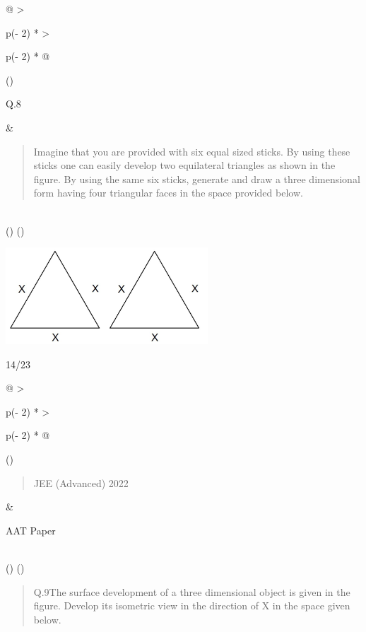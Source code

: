 \documentclass[
]{article}
\begin{document}
\begin{longtable}[]{@{}
  >{\raggedright\arraybackslash}p{(\columnwidth - 2\tabcolsep) * }
  >{\raggedright\arraybackslash}p{(\columnwidth - 2\tabcolsep) * }@{}}
\toprule()
\begin{minipage}[b]{\linewidth}\raggedright
Q.8
\end{minipage} & \begin{minipage}[b]{\linewidth}\raggedright
\begin{quote}
Imagine that you are provided with six equal sized sticks. By using
these sticks one can easily develop two equilateral triangles as shown
in the figure. By using the same six sticks, generate and draw a three
dimensional form having four triangular faces in the space provided
below.
\end{quote}
\end{minipage} \\
\midrule()
\endhead
\bottomrule()
\end{longtable}

\includegraphics[width=2.97917in,height=1.42639in]{vertopal_2361032064654423b71b7db67d98c753/media/image15.png}

14/23

\begin{longtable}[]{@{}
  >{\raggedright\arraybackslash}p{(\columnwidth - 2\tabcolsep) * }
  >{\raggedright\arraybackslash}p{(\columnwidth - 2\tabcolsep) * }@{}}
\toprule()
\begin{minipage}[b]{\linewidth}\raggedright
\begin{quote}
JEE (Advanced) 2022
\end{quote}
\end{minipage} & \begin{minipage}[b]{\linewidth}\raggedright
AAT Paper
\end{minipage} \\
\midrule()
\endhead
\bottomrule()
\end{longtable}

\begin{quote}
Q.9The surface development of a three dimensional object is given in the
figure. Develop its isometric view in the direction of X in the space
given below.
\end{quote}
\end{document}
